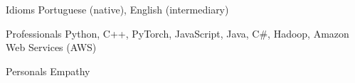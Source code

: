 
\begin{cvskills}
	\cvskill
	{Idioms}
	{Portuguese (native), English (intermediary)}

	\cvskill
	{Professionals}
	{Python, C++, PyTorch, JavaScript, Java, C\#, Hadoop, Amazon Web Services (AWS)}

	\cvskill
	{Personals}
	{Empathy}
\end{cvskills}
